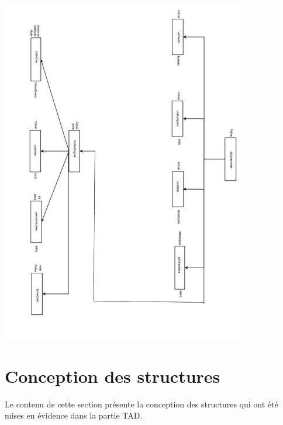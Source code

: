 \documentclass{article}
\begin{document}
    \includegraphics[width=0.8\textwidth]{images/decompresser.pdf}

\section{Conception des structures}
    Le contenu de cette section présente la conception des structures qui ont été mises en évidence dans la partie TAD.

    \clearpage

	
    \clearpage
    
	
    \clearpage
    
	
    \clearpage
    
	
    \clearpage
    
	
    \clearpage
    
	

\clearpage %
\end{document}
